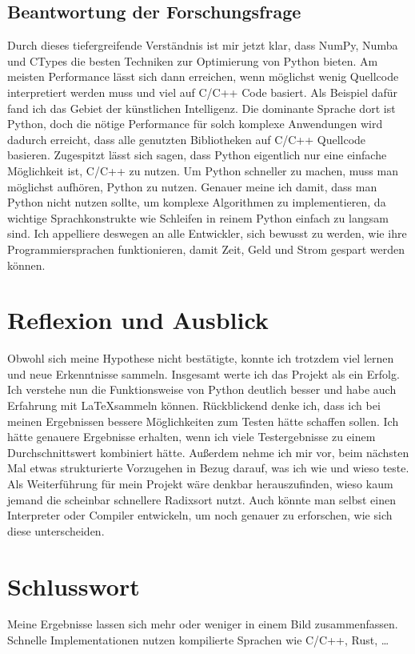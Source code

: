 \documentclass[11pt,a4paper]{article}
\begin{document}
\subsection{Beantwortung der Forschungsfrage}
Durch dieses tiefergreifende Verständnis ist mir jetzt klar, dass NumPy, Numba und CTypes
die besten Techniken zur Optimierung von Python bieten. Am meisten Performance lässt sich dann erreichen,
wenn möglichst wenig Quellcode interpretiert werden muss und viel auf C/C++ Code basiert.
Als Beispiel dafür fand ich das Gebiet der künstlichen Intelligenz.
Die dominante Sprache dort ist Python, doch die nötige Performance für solch komplexe Anwendungen
wird dadurch erreicht, dass alle genutzten Bibliotheken auf C/C++ Quellcode basieren.
Zugespitzt lässt sich sagen, dass Python eigentlich nur eine einfache Möglichkeit ist,
C/C++ zu nutzen. Um Python schneller zu machen, muss man möglichst aufhören, Python zu nutzen.
Genauer meine ich damit, dass man Python nicht nutzen sollte, um komplexe Algorithmen zu implementieren,
da wichtige Sprachkonstrukte wie Schleifen in reinem Python einfach zu langsam sind.
Ich appelliere deswegen an alle Entwickler, sich bewusst zu werden, wie ihre Programmiersprachen
funktionieren, damit Zeit, Geld und Strom gespart werden können.


\section{Reflexion und Ausblick}
Obwohl sich meine Hypothese nicht bestätigte, konnte ich trotzdem viel lernen
und neue Erkenntnisse sammeln. Insgesamt werte ich das Projekt als ein Erfolg.
Ich verstehe nun die Funktionsweise von Python deutlich besser und habe auch Erfahrung
mit \LaTeX sammeln können.
Rückblickend denke ich, dass ich bei meinen Ergebnissen bessere Möglichkeiten zum Testen
hätte schaffen sollen. Ich hätte genauere Ergebnisse erhalten, wenn ich viele Testergebnisse zu einem
Durchschnittswert kombiniert hätte.
Außerdem nehme ich mir vor, beim nächsten Mal etwas strukturierte Vorzugehen in Bezug darauf,
was ich wie und wieso teste.
Als Weiterführung für mein Projekt wäre denkbar herauszufinden, wieso kaum jemand die scheinbar
schnellere Radixsort nutzt.
Auch könnte man selbst einen Interpreter oder Compiler entwickeln, um noch genauer zu erforschen,
wie sich diese unterscheiden.

\section{Schlusswort}
Meine Ergebnisse lassen sich mehr oder weniger in einem Bild zusammenfassen.
Schnelle Implementationen nutzen kompilierte Sprachen wie C/C++, Rust, \dots
\end{document}
